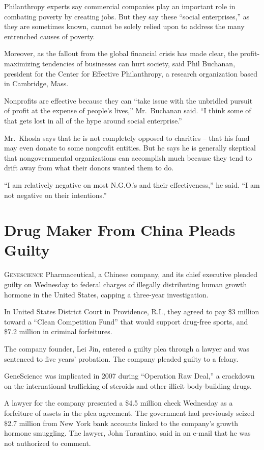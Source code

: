 ﻿\documentclass[12pt]{article}
\begin{document}
Philanthropy experts say commercial companies play an important role in combating poverty by
creating jobs. But they say these ``social enterprises,'' as they are sometimes known, cannot be
solely relied upon to address the many entrenched causes of poverty.

Moreover, as the fallout from the global financial crisis has made clear, the profit-maximizing
tendencies of businesses can hurt society, said Phil Buchanan, president for the Center for
Effective Philanthropy, a research organization based in Cambridge, Mass.

Nonprofits are effective because they can ``take issue with the unbridled pursuit of profit at the
expense of people's lives,'' Mr.~Buchanan said. ``I think some of that gets lost in all of the hype
around social enterprise.''

Mr.~Khosla says that he is not completely opposed to charities -- that his fund may even donate to
some nonprofit entities. But he says he is generally skeptical that nongovernmental organizations
can accomplish much because they tend to drift away from what their donors wanted them to do.

``I am relatively negative on most N.G.O.'s and their effectiveness,'' he said. ``I am not negative
on their intentions.''

\section{Drug Maker From China Pleads Guilty}

\lettrine{G}{enescience} Pharmaceutical, a Chinese company, and its chief
executive pleaded guilty on Wednesday to federal charges of illegally distributing human growth
hormone in the United States, capping a three-year investigation.

In United States District Court in Providence, R.I., they agreed to pay \$3 million toward a ``Clean
Competition Fund'' that would support drug-free sports, and \$7.2 million in criminal forfeitures.

The company founder, Lei Jin, entered a guilty plea through a lawyer and was sentenced to five
years' probation. The company pleaded guilty to a felony.

GeneScience was implicated in 2007 during ``Operation Raw Deal,'' a crackdown on the international
trafficking of steroids and other illicit body-building drugs.

A lawyer for the company presented a \$4.5 million check Wednesday as a forfeiture of assets in the
plea agreement. The government had previously seized \$2.7 million from New York bank accounts
linked to the company's growth hormone smuggling. The lawyer, John Tarantino, said in an e-mail that
he was not authorized to comment.
\end{document}
